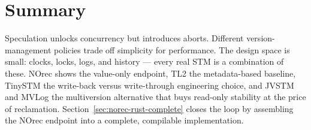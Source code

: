 \section{Summary}

Speculation unlocks concurrency but introduces aborts. Different version-management policies trade off simplicity for performance. The design space is small: clocks, locks, logs, and history --- every real STM is a combination of these. NOrec shows the value-only endpoint, TL2 the metadata-based baseline, TinySTM the write-back versus write-through engineering choice, and JVSTM and MVLog the multiversion alternative that buys read-only stability at the price of reclamation. Section~\ref{sec:norec-rust-complete} closes the loop by assembling the NOrec endpoint into a complete, compilable implementation.

